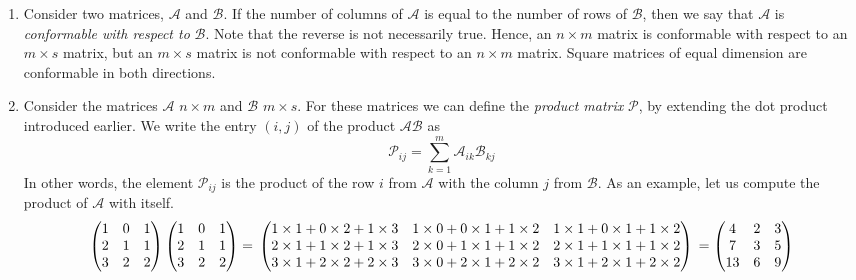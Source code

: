 \begin{enumerate}
\item Consider two matrices, $\mathcal{A}$ and $\mathcal{B}$.  If the number of columns of $\mathcal{A}$ is equal to the number of rows of $\mathcal{B}$,
then we say that $\mathcal{A}$ is \textit{conformable with respect to} $\mathcal{B}$.  Note that the reverse is not necessarily true.  Hence, 
an $n\times m$ matrix is conformable with respect to an $m\times s$ matrix, but an $m\times s$ matrix is not conformable with respect to an
$n\times m$ matrix.  Square matrices of equal dimension are conformable in both directions.

\item Consider the matrices $\mathcal{A}$ $n\times m$ and $\mathcal{B}$ $m\times s$.  For these matrices we can define the \textit{product matrix}
$\mathcal{P}$, by extending the dot product introduced earlier.  We write the entry $(i,j)$ of the product $\mathcal{A}\mathcal{B}$ as
\begin{equation}
\mathcal{P}_{ij}=\sum_{k=1}^{m}\mathcal{A}_{ik}\mathcal{B}_{kj}
\end{equation}
In other words, the element $\mathcal{P}_{ij}$ is the product of the row $i$ from $\mathcal{A}$ with the
column $j$ from $\mathcal{B}$.  As an example, let us compute the product of $\mathcal{A}$ with itself.
{\small
\[
\begin{pmatrix}1&0&1\\ 2&1&1\\ 3&2&2\end{pmatrix}\begin{pmatrix}1&0&1\\ 2&1&1\\ 3&2&2\end{pmatrix}=\\
\begin{pmatrix}1\times 1+0\times 2+1\times 3&1\times 0+0\times 1+1\times 2&1\times 1+0\times 1+1\times 2\\
2\times 1+1\times 2+1\times 3&2\times 0+1\times 1+1\times 2&2\times 1+1\times 1+1\times 2\\
3\times 1+2\times 2+2\times 3&3\times 0+2\times 1+2\times 2&3\times 1+2\times 1+2\times 2\end{pmatrix}\\
=\begin{pmatrix}4&2&3\\ 7&3&5\\ 13&6&9\end{pmatrix}
\]}


\end{enumerate}
